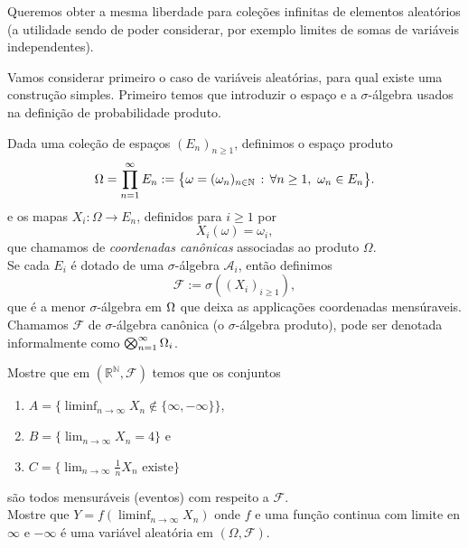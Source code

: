 Queremos obter a mesma liberdade para coleções infinitas de elementos aleatórios
(a utilidade sendo de poder considerar, por exemplo limites de somas de variáveis independentes).

\medskip

Vamos considerar primeiro o caso de variáveis aleatórias, para qual existe uma construção simples.
Primeiro temos que introduzir o espaço e a $\sigma$-álgebra usados na definição de probabilidade produto.

\begin{definition}
Dada uma coleção de espaços $(E_n)_{n\ge 1}$, definimos o espaço produto
\begin{equation}
  \Omega = \prod_{n=1}^{\infty} E_n := \big\{\omega=(\omega_n)_{n\in {\ensuremath{\mathbb N}}} \, : \, \forall n\ge 1, \   \omega_n \in E_n \big\}.
\end{equation}
e os mapas $X_i:\Omega \to E_n$, definidos para $i\ge 1$ por
\begin{equation}
  X_i(\omega) = \omega_i,
\end{equation}
que chamamos de \emph{coordenadas canônicas}  associadas ao produto $\Omega$.\\
Se cada $E_i$ é dotado de uma $\sigma$-álgebra $\mathcal{A}_i$, então definimos
\begin{equation}
  \mathcal{F} := \sigma( (X_i)_{i\geq 1} ),
\end{equation}
que é a menor $\sigma$-álgebra em $\Omega$ que deixa as applicações coordenadas mensúraveis.
Chamamos $\mathcal{F}$ de $\sigma$-álgebra canônica (o $\sigma$-álgebra produto), pode ser denotada informalmente como $\bigotimes_{n=1}^{\infty}\Omega_i$.
\end{definition}

\begin{exercise}
  Mostre que em $(\mathbb{R}^{\mathbb{N}},\mathcal{F})$ temos que os conjuntos
  \begin{enumerate}[\quad a)]
  \item $A = \{ \liminf_{n\to \infty} X_n \notin \{\infty,-\infty\} \}$,
  \item $B = \{ \lim_{n\to \infty} X_n = 4\}$ e
  \item $C = \{ \lim_{n\to \infty} \tfrac{1}{n} X_n \text{ existe}\}$
  \end{enumerate}
  são todos mensuráveis (eventos) com respeito a $\mathcal{F}$.\\
  \noindent Mostre que $Y = f(\liminf_{n\to \infty} X_n)$ onde $f$ e uma função continua com limite en $\infty$ e $-\infty$ é uma variável aleatória em $(\Omega, \mathcal{F})$.
\end{exercise}

